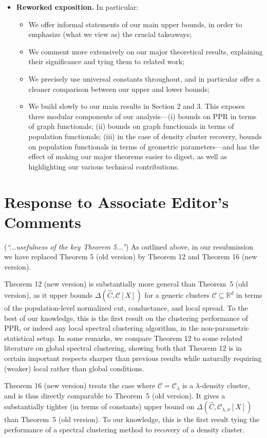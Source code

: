 \documentclass{article}
\newcommand{\Reals}{\mathbb{R}}
\newcommand{\1}{\mathbf{1}}
\newcommand{\Rd}{\Reals^d}
\newcommand{\mc}[1]{\mathcal{#1}}
\newcommand{\wh}[1]{\widehat{#1}}
\theoremstyle{alden}
\theoremstyle{aldenthm}
\theoremstyle{definition}
\theoremstyle{remark}
\begin{document}
\begin{itemize}
	\item \textbf{Reworked exposition.} In particular: 
	\begin{itemize}
		\item We offer informal statements of our main upper bounds, in order to emphasize (what we view as) the crucial takeaways;
		\item We comment more extensively on our major theoretical results, explaining their significance and tying them to related work;
		\item We precisely use universal constants throughout, and in particular offer a cleaner comparison between our upper and lower bounds;
		\item We build slowly to our main results in Section 2 and 3. This exposes three modular components of our analysis---(i) bounds on PPR in terms of graph functionals; (ii) bounds on graph functionals in terms of population functionals; (iii) in the case of density cluster recovery, bounds on population functionals in terms of geometric parameters---and has the effect of making our major theorems easier to digest, as well as highlighting our various technical contributions.
	\end{itemize}
\end{itemize}

\section{Response to Associate Editor's Comments}

(\textit{``...usefulness of the key Theorem 5...''}) As outlined above, in our resubmission we have replaced Theorem 5 (old version) by Theorem 12 and Theorem 16 (new version). 

Theorem 12 (new version)  is substantially more general than Theorem~5 (old version), as it upper bounds $\Delta(\wh{C},\mc{C}[X])$ for a generic clusters $\mc{C} \subseteq \Rd$ in terms of the population-level normalized cut, conductance, and local spread. To the best of our knowledge, this is the first result on the clustering performance of PPR, or indeed any local spectral clustering algorithm, in the non-parametric statistical setup. In some remarks, we compare Theorem 12 to some related literature on global spectral clustering, showing both that Theorem 12 is in certain important respects sharper than previous results while naturally requiring (weaker) local rather than global conditions.

Theorem 16 (new version) treats the case where $\mc{C} = \mc{C}_{\lambda}$ is a $\lambda$-density cluster, and is thus directly comparable to Theorem~5 (old version). It gives a substantially tighter (in terms of constants) upper bound on $\Delta(\wh{C},\mc{C}_{\lambda,\sigma}[X])$ than Theorem~5 (old version). To our knowledge, this is the first result tying the performance of a spectral clustering method to recovery of a density cluster.
\end{document}

